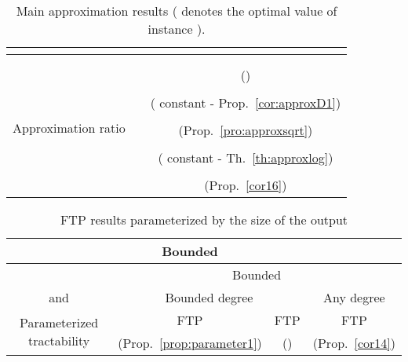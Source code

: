 \documentclass[final]{dmtcs-episciences}
\begin{document}
\begin{center}
\begin{table}[ht]
\centering
\footnotesize
\begin{tabular}{|c|c|c|c|}
\hline 
 &\multicolumn{1}{|c|}{}& \multicolumn{2}{|c|}{}\\
\hline
 &\multicolumn{2}{|c|}{}& \\
\hline
\hline
\multirow{12}{*}{Approximation ratio} &\multirow{6}{*}{}&\multicolumn{2}{|c|}{}\\
&&\multicolumn{2}{|c|}{(\citet{Fertin200990})}\\
\cline{3-4}
&&\multicolumn{2}{|c|}{}\\
&&\multicolumn{2}{|c|}{( constant \-- Prop.~\ref{cor:approxD1})}\\
\cline{3-4}
&( const.,  \-- Prop.~\ref{prop:generalapprox})&&\\
&&\multicolumn{2}{|c|}{(Prop.~\ref{pro:approxsqrt})}\\
\cline{3-4}
&&\multicolumn{2}{|c|}{}\\
&&\multicolumn{2}{|c|}{( constant \-- Th.~\ref{th:approxlog})}\\
\cline{3-4}
&&\multicolumn{2}{|c|}{}\\
&&\multicolumn{2}{|c|}{(Prop.~\ref{cor16})}\\
\hline
\end{tabular}
\caption{Main approximation results ( denotes the optimal value of instance ).}
\label{table-approx}
\end{table}
\end{center}

\begin{center}
\begin{table}[ht]
\centering
\footnotesize
\begin{tabular}{|c|c|c|c|}
\hline 
 &\multicolumn{1}{|c|}{Bounded }& \multicolumn{2}{|c|}{}\\
\hline
 &\multicolumn{3}{|c|}{Bounded }\\
\hline
 and & \multicolumn{2}{|c|}{Bounded degree}&Any degree\\
\hline
\hline
\multirow{2}{*}{Parameterized tractability} &FTP&FTP&FTP\\
&(Prop.~\ref{prop:parameter1})&(\citet{Fertin200990})&(Prop.~\ref{cor14})\\
\hline
\end{tabular}
\caption{FTP results parameterized by the size of the output}
\label{table-parameter}
\end{table}
\end{center}
\end{document}
